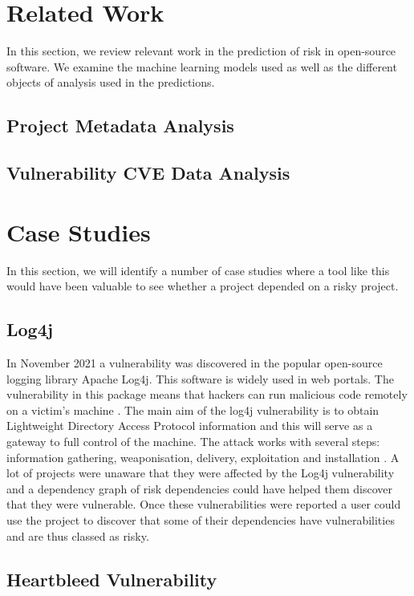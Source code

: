 \documentclass[10pt, compsoc, conference]{IEEEtran}
\begin{document}
\section{Related Work}
In this section, we review relevant work in the prediction of risk in open-source software. We examine the machine learning models used as well as the different objects of analysis used in the predictions.  

\subsection{Project Metadata Analysis}


\subsection{Vulnerability CVE Data Analysis}


\section{Case Studies}
In this section, we will identify a number of case studies where a tool like this would have been valuable to see whether a project depended on a risky project. 

\subsection{Log4j}
In November 2021 a vulnerability was discovered in the popular open-source logging library Apache Log4j. This software is widely used in web portals. The vulnerability in this package means that hackers can run malicious code remotely on a victim's machine \cite{h_gupta_identification_2022}. The main aim of the log4j vulnerability is to obtain Lightweight Directory Access Protocol information and this will serve as a gateway to full control of the machine. The attack works with several steps: information gathering, weaponisation, delivery, exploitation and installation \cite{f_maulana_unmasking_2023}. A lot of projects were unaware that they were affected by the Log4j vulnerability and a dependency graph of risk dependencies could have helped them discover that they were vulnerable. Once these vulnerabilities were reported a user could use the project to discover that some of their dependencies have vulnerabilities and are thus classed as risky. 

\subsection{Heartbleed Vulnerability}
\end{document}
